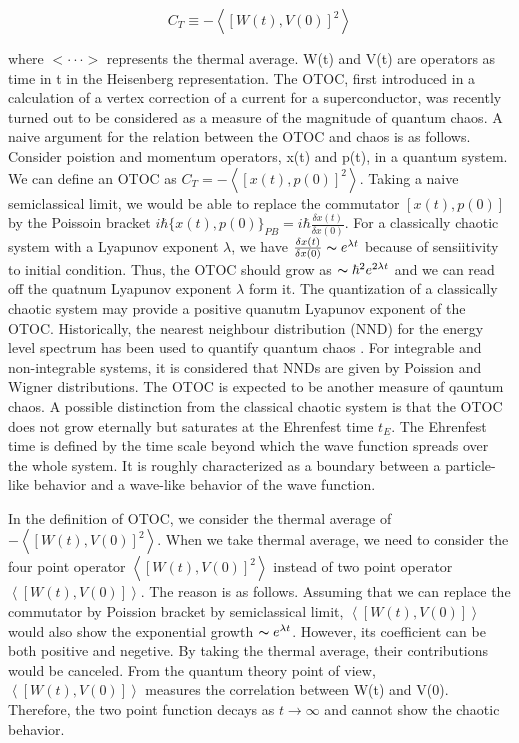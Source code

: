 \documentclass[12pt, letterpaper]{article}
\newcommand*{\1}{\hspace{1pt}}
\begin{document}
        \begin{equation}
            C_{T} \equiv  - \left\langle\left[W(t),V(0)\right]^{2}\right\rangle
        \end{equation}

        where $<\cdot \cdot \cdot >$ represents the thermal average. W(t) and V(t) are operators as time in t in the Heisenberg representation. The OTOC, first introduced
        in a calculation of a vertex correction of a current for a superconductor\cite{s12}, was recently turned out to be considered as a measure of the magnitude of 
        quantum chaos. A naive argument for the relation between the OTOC and chaos is as follows\cite{s13}. Consider poistion and momentum operators, x(t) and p(t), in a
        quantum system. We can define an OTOC as $C_{T} = - \left\langle\left[x(t),p(0)\right]^{2}\right\rangle$. Taking a naive semiclassical limit, we would be able to 
        replace the commutator $\left[x(t),p(0)\right]$ by the Poissoin bracket $i\hbar\{x(t),p(0)\}_{PB} = i\hbar\frac{\delta x(t)}{\delta x(0)}$. For a classically 
        chaotic system with a Lyapunov exponent $\lambda$, we have $\frac{\delta x(t)}{\delta x(0)}\thicksim  e^{\lambda t}$ because of sensiitivity to initial condition.
        Thus, the OTOC should grow as $\thicksim \hbar^{2}e^{2\lambda t}$ and we can read off the quatnum Lyapunov exponent $\lambda$ form it. The quantization of a 
        classically chaotic system may provide a positive quanutm Lyapunov exponent of the OTOC. Historically, the nearest neighbour distribution (NND) for the energy
        level spectrum has been used to quantify quantum chaos \cite{14}. For integrable and non-integrable systems, it is considered that NNDs are given by Poission
        and Wigner distributions. The OTOC is expected to be another measure of qauntum chaos. A possible distinction from the classical chaotic system is that the 
        OTOC does not grow eternally but saturates at the Ehrenfest time $t_{E}$. The Ehrenfest time is defined by the time scale beyond which the wave function spreads
        over the whole system. It is roughly characterized as a boundary between a particle-like behavior and a wave-like behavior of the wave function.

        In the definition of OTOC, we consider the thermal average of $- \left\langle\left[W(t),V(0)\right]^{2}\right\rangle$. When we take thermal average, we need to 
        consider the four point operator $\left\langle\left[W(t),V(0)\right]^{2}\right\rangle$ instead of two point operator $\left\langle\left[W(t),V(0)\right]\right\rangle$.
        The reason is as follows. Assuming that we can replace the commutator by Poission bracket by semiclassical limit, $\left\langle\left[W(t),V(0)\right]\right\rangle$
        would also show the exponential growth $\thicksim  e^{\lambda t}$. However, its coefficient can be both positive and negetive. By taking the thermal average, their
        contributions would be canceled. From the quantum theory point of view, $\left\langle\left[W(t),V(0)\right]\right\rangle$ measures the correlation between W(t)
        and V(0). Therefore, the two point function decays as $t \rightarrow \infty$ and cannot show the chaotic behavior.
\end{document}
